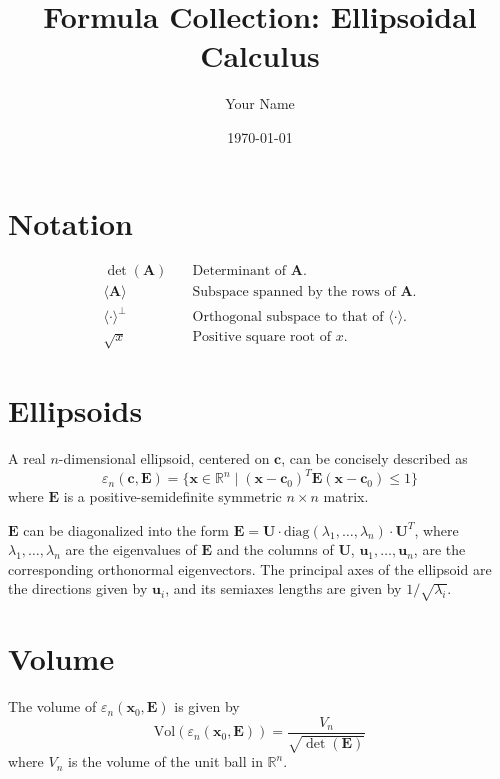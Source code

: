 \documentclass[a4paper,11pt]{article}
\title{Formula Collection: Ellipsoidal Calculus}
\author{Your Name}
\date{\today}
\begin{document}
\maketitle
\tableofcontents

\section{Notation}
\begin{align}
\det(\mathbf{A}) &\quad \text{Determinant of $\mathbf{A}$.} \\
\langle\mathbf{A}\rangle &\quad \text{Subspace spanned by the rows of $\mathbf{A}$.} \\
\langle\cdot\rangle^{\perp} &\quad \text{Orthogonal subspace to that of $\langle\cdot\rangle$.} \\
\sqrt{x} &\quad \text{Positive square root of $x$.}
\end{align}

\section{Ellipsoids}

A real $n$-dimensional ellipsoid, centered on $\mathbf{c}$, can be concisely described as
\begin{equation}
\varepsilon_n(\mathbf{c}, \mathbf{E}) = \{\mathbf{x} \in \mathbb{R}^n \mid (\mathbf{x}-\mathbf{c}_0)^T\mathbf{E}(\mathbf{x}-\mathbf{c}_0) \leq 1\}
\end{equation}
where $\mathbf{E}$ is a positive-semidefinite symmetric $n \times n$ matrix. 

$\mathbf{E}$ can be diagonalized into the form $\mathbf{E} = \mathbf{U} \cdot \text{diag}(\lambda_1,\ldots,\lambda_n) \cdot \mathbf{U}^T$, 
where $\lambda_1, \ldots, \lambda_n$ are the eigenvalues of $\mathbf{E}$ and the columns of $\mathbf{U}$, $\mathbf{u}_1,\ldots,\mathbf{u}_n$,
 are the corresponding orthonormal eigenvectors. 
 The principal axes of the ellipsoid are the directions given by $\mathbf{u}_i$, and its semiaxes lengths are given by $1/\sqrt{\lambda_i}$.
 

\section{Volume}

The volume of $\varepsilon_n(\mathbf{x}_0, \mathbf{E})$ is given by
\begin{equation}
\text{Vol}(\varepsilon_n(\mathbf{x}_0, \mathbf{E})) = \frac{V_n}{\sqrt{\det(\mathbf{E})}}
\end{equation}
where $V_n$ is the volume of the unit ball in $\mathbb{R}^n$.
\end{document}
